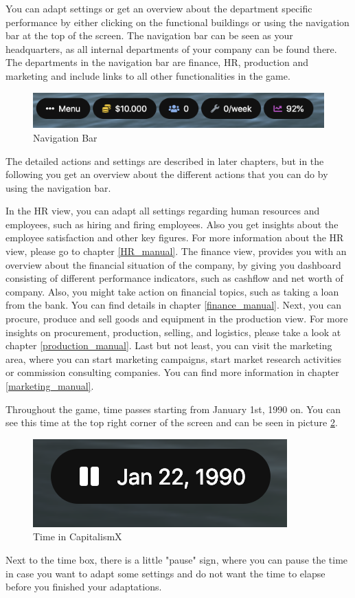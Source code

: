 \documentclass[11pt,titlepage,oneside,openany]{book}
\begin{document}
You can adapt settings or get an overview about the department specific performance by either clicking on the functional buildings or using the navigation bar at the top of the screen. The navigation bar can be seen as your headquarters, as all internal departments of your company can be found there. The departments in the navigation bar are finance, HR, production and marketing and include links to all other functionalities in the game. 
\begin{figure} [!htbp]
    \centering
    \includegraphics [width=\textwidth]{images/navigationBar.png}
    \caption{Navigation Bar}
    \label{fig:navigationBar}
\end{figure} The detailed actions and settings are described in later chapters, but in the following you get an overview about the different actions that you can do by using the navigation bar.

In the HR view, you can adapt all settings regarding human resources and employees, such as hiring and firing employees. Also you get insights about the employee satisfaction and other key figures. For more information about the HR view, please go to chapter \ref{HR_manual}.
The finance view, provides you with an overview about the financial situation of the company, by giving you dashboard consisting of different performance indicators, such as cashflow and net worth of company. Also, you might take action on financial topics, such as taking a loan from the bank. You can find details in chapter \ref{finance_manual}.
Next, you can procure, produce and sell goods and equipment in the production view. For more insights on procurement, production, selling, and logistics, please take a look at chapter \ref{production_manual}. 
Last but not least, you can visit the marketing area, where you can start marketing campaigns, start market research activities or commission consulting companies. You can find more information in chapter \ref{marketing_manual}.

Throughout the game, time passes starting from January 1st, 1990 on. You can see this time at the top right corner of the screen and can be seen in picture \ref{fig:time}.
\begin{figure} [!htbp]
    \centering
    \includegraphics{images/time.png}
    \caption{Time in CapitalismX}
    \label{fig:time}
\end{figure}
Next to the time box, there is a little "pause" sign, where you can pause the time in case you want to adapt some settings and do not want the time to elapse before you finished your adaptations.
\end{document}
